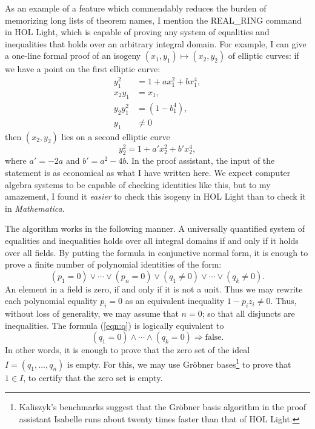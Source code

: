 \documentclass{llncs}
\begin{document}
As an example of a feature which commendably reduces the burden of
memorizing long lists of theorem names, I mention the {REAL\_RING}
command in HOL Light, which is capable of proving any system of
equalities and inequalities that holds over an arbitrary integral
domain.  For example, I can give a one-line formal proof of  an isogeny
$(x_1,y_1) \mapsto (x_2,y_2)$ of elliptic curves: if we have a point
on the first elliptic curve:
\begin{align*}
y_1^2 &= 1 + a x_1^2 + b x_1^4,\\
x_2 y_1&=x_1,\\
y_2 y_1^2&=(1 - b_1^4),\\
y_1&\ne 0
\end{align*}
then $(x_2,y_2)$ lies on a second elliptic curve
\[
y_2^2 = 1 + a' x_2^2 + b' x_2^4,
\]
where $a' = -2a$ and $b' = a^2 - 4b$.  In the proof assistant, 
the input of the
statement is as economical as what I have written here. We expect computer
algebra systems to be capable of checking identities like this, but to
my amazement, I found it {\it easier} to check this isogeny in HOL
Light than to check it in {\it Mathematica}.

The algorithm works in the following manner.  A universally quantified
system of equalities and inequalities holds over all integral domains
if and only if it holds over all fields.  By putting the formula in
conjunctive normal form, it is enough to prove a finite number of
polynomial identities of the form:
\begin{equation}\label{eqn:q}
(p_1=0) \lor \cdots \lor (p_n=0) \lor (q_1\ne 0) \lor\cdots\lor (q_k\ne 0).
\end{equation}
An element in a field is zero, if and only if it is not a unit.  Thus
we may rewrite each polynomial equality $p_i=0$ as an equivalent
inequality $1-p_i z_i\ne 0$.  Thus, without loss of generality, we may
assume that $n=0$; so that all disjuncts are inequalities.  The
formula (\ref{eqn:q}) is logically equivalent to
\[
(q_1 =0) \land \cdots \land (q_k = 0) \Longrightarrow \text{false}.
\]
In other words, it is enough to prove that the zero set of the ideal
$I=(q_1,\ldots,q_n)$ is empty.  For this, we may use
Gr\"obner bases\footnote{Kaliszyk's benchmarks suggest that the
  Gr\"obner basis algorithm in the proof assistant Isabelle runs about
  twenty times faster than that of HOL Light.
}  to prove that $1\in I$, to certify that
the zero set is empty.  

\end{document}

